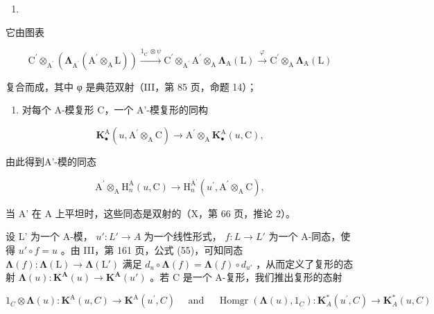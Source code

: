 \begin{enumerate}
\def\labelenumi{(\arabic{enumi})}
\setcounter{enumi}{8}
\tightlist
\item
\end{enumerate}

它由图表

\[
\mathrm{C} ^ {\prime} \otimes_ {\mathrm{A} ^ {\prime}} \left(\boldsymbol {\Lambda} _ {\mathrm{A} ^ {\prime}} \left(\mathrm{A} ^ {\prime} \otimes_ {\mathrm{A}} \mathrm{L}\right)\right) \xrightarrow {1 _ {\mathrm{C} ^ {\prime}} \otimes \psi} \mathrm{C} ^ {\prime} \otimes_ {\mathrm{A} ^ {\prime}} \mathrm{A} ^ {\prime} \otimes_ {\mathrm{A}} \boldsymbol {\Lambda} _ {\mathrm{A}} (\mathrm{L}) \xrightarrow {\varphi} \mathrm{C} ^ {\prime} \otimes_ {\mathrm{A}} \boldsymbol {\Lambda} _ {\mathrm{A}} (\mathrm{L})
\]

复合而成，其中 φ 是典范双射（III，第 85 页，命题 14）；

\begin{enumerate}
\def\labelenumi{\arabic{enumi})}
\setcounter{enumi}{1}
\tightlist
\item
  对每个 A-模复形 C，一个 A'-模复形的同构
\end{enumerate}

\[
\mathbf {K} _ {\bullet} ^ {\mathrm{A}} (u, \mathrm{A} ^ {\prime} \otimes_ {\mathrm{A}} \mathrm{C}) \rightarrow \mathrm{A} ^ {\prime} \otimes_ {\mathrm{A}} \mathbf {K} _ {\bullet} ^ {\mathrm{A}} (u, \mathrm{C}),
\]

由此得到A'-模的同态

\[
\mathrm{A} ^ {\prime} \otimes_ {\mathrm{A}} \mathrm{H} _ {n} ^ {\mathrm{A}} (u, \mathrm{C}) \rightarrow \mathrm{H} _ {n} ^ {\mathrm{A} ^ {\prime}} (u ^ {\prime}, \mathrm{A} ^ {\prime} \otimes_ {\mathrm{A}} \mathrm{C}),
\]

当 A' 在 A 上平坦时，这些同态是双射的（X，第 66 页，推论 2）。

设 L' 为一个 A-模， \(u': L' \to A\) 为一个线性形式， \(f: L \to L'\) 为一个 A-同态，使得 \(u' \circ f = u\) 。由 III，第 161 页，公式 (55)，可知同态 \(\symbf{\Lambda}(f): \symbf{\Lambda}(\mathrm{L}) \to \symbf{\Lambda}(\mathrm{L}')\) 满足 \(d_u \circ \symbf{\Lambda}(f) = \symbf{\Lambda}(f) \circ d_{u'}\) ，从而定义了复形的态射 \(\symbf{\Lambda}(u): \mathbf{K}^{\mathbf{A}}(u) \to \mathbf{K}^{\mathbf{A}}(u')\) 。若 C 是一个 A-复形，我们推出复形的态射

\[
1 _ {C} \otimes \boldsymbol {\Lambda} (u): \mathbf {K} ^ {\mathrm{A}} (u, C) \rightarrow \mathbf {K} ^ {\mathrm{A}} \left(u ^ {\prime}, C\right) \quad \text { and }\quad \operatorname{Homgr} \left(\boldsymbol {\Lambda} (u), 1 _ {C}\right): \mathbf {K} _ {A} ^ {*} \left(u ^ {\prime}, C\right)\rightarrow \mathbf {K} _ {A} ^ {*} (u, C)
\]

